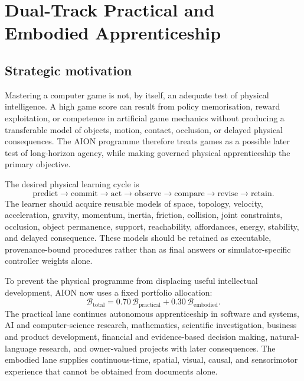 
\section{Dual-Track Practical and Embodied Apprenticeship}
\label{sec:dual-track-embodied-apprenticeship}

\subsection{Strategic motivation}

Mastering a computer game is not, by itself, an adequate test of physical
intelligence.  A high game score can result from policy memorisation, reward
exploitation, or competence in artificial game mechanics without producing a
transferable model of objects, motion, contact, occlusion, or delayed physical
consequences.  The AION programme therefore treats games as a possible later
test of long-horizon agency, while making governed physical apprenticeship the
primary objective.

The desired physical learning cycle is
\begin{equation}
\label{eq:embodied-governed-cycle}
\text{predict}
\rightarrow \text{commit}
\rightarrow \text{act}
\rightarrow \text{observe}
\rightarrow \text{compare}
\rightarrow \text{revise}
\rightarrow \text{retain}.
\end{equation}
The learner should acquire reusable models of space, topology, velocity,
acceleration, gravity, momentum, inertia, friction, collision, joint
constraints, occlusion, object permanence, support, reachability, affordances,
energy, stability, and delayed consequence.  These models should be retained
as executable, provenance-bound procedures rather than as final answers or
simulator-specific controller weights alone.

To prevent the physical programme from displacing useful intellectual
development, AION now uses a fixed portfolio allocation:
\begin{equation}
\label{eq:seventy-thirty-allocation}
\mathcal{B}_{\mathrm{total}}
=0.70\,\mathcal{B}_{\mathrm{practical}}
+0.30\,\mathcal{B}_{\mathrm{embodied}}.
\end{equation}
The practical lane continues autonomous apprenticeship in software and systems,
AI and computer-science research, mathematics, scientific investigation,
business and product development, financial and evidence-based decision
making, natural-language research, and owner-valued projects with later
consequences.  The embodied lane supplies continuous-time, spatial, visual,
causal, and sensorimotor experience that cannot be obtained from documents
alone.

